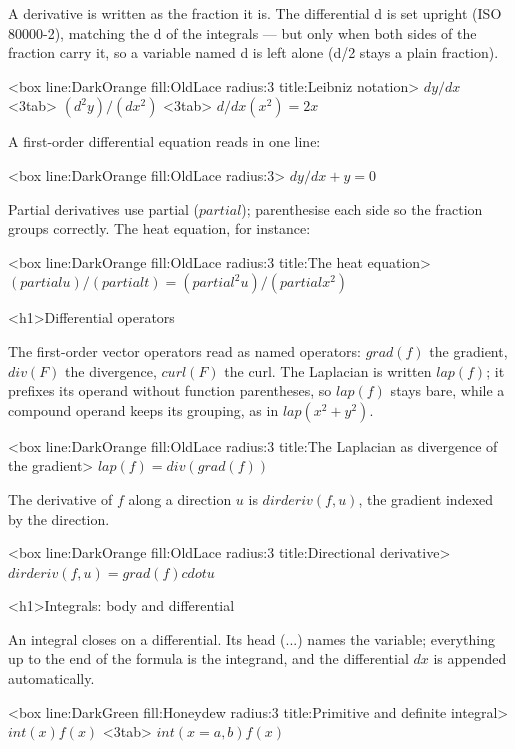\documentclass[
  margins=8,
  font=Latin Modern Roman,
  size=12,
  linespread=1.4,
  lang=en,
  precision=4
]{scholatex}
\begin{document}
A derivative is written as the fraction it is. The differential d is
set upright (ISO 80000-2), matching the d of the integrals — but only
when both sides of the fraction carry it, so a variable named d is left
alone (d/2 stays a plain fraction).

<box line:DarkOrange fill:OldLace radius:3 title:{Leibniz notation}>{
	$dy/dx$ <3tab> $(d^2 y)/(dx^2)$ <3tab> $d/dx (x^2) = 2x$
}

A first-order differential equation reads in one line:

<box line:DarkOrange fill:OldLace radius:3>{
	$dy/dx + y = 0$
}

Partial derivatives use partial ($partial$); parenthesise each side so
the fraction groups correctly. The heat equation, for instance:

<box line:DarkOrange fill:OldLace radius:3 title:{The heat equation}>{
	$(partial u)/(partial t) = (partial^2 u)/(partial x^2)$
}

<h1>Differential operators

The first-order vector operators read as named operators: $grad(f)$ the
gradient, $div(F)$ the divergence, $curl(F)$ the curl. The Laplacian is
written $lap(f)$; it prefixes its operand without function parentheses, so
$lap(f)$ stays bare, while a compound operand keeps its grouping, as in
$lap(x^2 + y^2)$.

<box line:DarkOrange fill:OldLace radius:3 title:{The Laplacian as divergence of the gradient}>{
	$lap(f) = div(grad(f))$
}

The derivative of $f$ along a direction $u$ is $dirderiv(f, u)$, the gradient
indexed by the direction.

<box line:DarkOrange fill:OldLace radius:3 title:{Directional derivative}>{
	$dirderiv(f, u) = grad(f) cdot u$
}

<h1>Integrals: body and differential

An integral closes on a differential. Its head (...) names the
variable; everything up to the end of the formula is the integrand, and the
differential $dx$ is appended automatically.

<box line:DarkGreen fill:Honeydew radius:3 title:{Primitive and definite integral}>{
	$int(x) f(x)$ <3tab> $int(x=a, b) f(x)$
}
\end{document}
